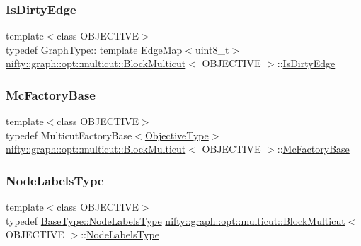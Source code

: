 \subsubsection{\texorpdfstring{Is\+Dirty\+Edge}{IsDirtyEdge}}
{\footnotesize\ttfamily template$<$class O\+B\+J\+E\+C\+T\+I\+VE$>$ \\
typedef Graph\+Type\+:: template Edge\+Map$<$uint8\+\_\+t$>$ \hyperlink{classnifty_1_1graph_1_1opt_1_1multicut_1_1BlockMulticut}{nifty\+::graph\+::opt\+::multicut\+::\+Block\+Multicut}$<$ O\+B\+J\+E\+C\+T\+I\+VE $>$\+::\hyperlink{classnifty_1_1graph_1_1opt_1_1multicut_1_1BlockMulticut_a28a7a6db633242bc0d826a5814fa4262}{Is\+Dirty\+Edge}}

\mbox{\label{classnifty_1_1graph_1_1opt_1_1multicut_1_1BlockMulticut_add71703aaed725b89f664a0dba768685}} 
\subsubsection{\texorpdfstring{Mc\+Factory\+Base}{McFactoryBase}}
{\footnotesize\ttfamily template$<$class O\+B\+J\+E\+C\+T\+I\+VE$>$ \\
typedef Multicut\+Factory\+Base$<$\hyperlink{classnifty_1_1graph_1_1opt_1_1multicut_1_1BlockMulticut_a3a9ea9285ed606615a72dead69babd0a}{Objective\+Type}$>$ \hyperlink{classnifty_1_1graph_1_1opt_1_1multicut_1_1BlockMulticut}{nifty\+::graph\+::opt\+::multicut\+::\+Block\+Multicut}$<$ O\+B\+J\+E\+C\+T\+I\+VE $>$\+::\hyperlink{classnifty_1_1graph_1_1opt_1_1multicut_1_1BlockMulticut_add71703aaed725b89f664a0dba768685}{Mc\+Factory\+Base}}

\mbox{\label{classnifty_1_1graph_1_1opt_1_1multicut_1_1BlockMulticut_a15d311d945f41644c0f7230f8fb62335}} 
\subsubsection{\texorpdfstring{Node\+Labels\+Type}{NodeLabelsType}}
{\footnotesize\ttfamily template$<$class O\+B\+J\+E\+C\+T\+I\+VE$>$ \\
typedef \hyperlink{classnifty_1_1graph_1_1opt_1_1common_1_1SolverBase_abefd51561de2fd009f6bed6bef6009ea}{Base\+Type\+::\+Node\+Labels\+Type} \hyperlink{classnifty_1_1graph_1_1opt_1_1multicut_1_1BlockMulticut}{nifty\+::graph\+::opt\+::multicut\+::\+Block\+Multicut}$<$ O\+B\+J\+E\+C\+T\+I\+VE $>$\+::\hyperlink{classnifty_1_1graph_1_1opt_1_1multicut_1_1BlockMulticut_a15d311d945f41644c0f7230f8fb62335}{Node\+Labels\+Type}}

